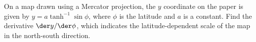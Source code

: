 On a map drawn using a Mercator projection, the $y$ coordinate on the paper
is given by $y=a \tanh^{-1}\sin\phi$, where $\phi$ is the latitude and $a$
is a constant. Find the derivative $\der y/\der\phi$, which indicates the
latitude-dependent scale of the map in the north-south direction.\answercheck
